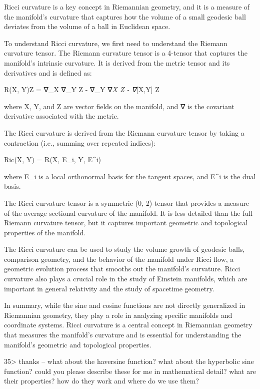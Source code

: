 \documentclass[
]{article}
\begin{document}
Ricci curvature is a key concept in Riemannian geometry, and it is a
measure of the manifold's curvature that captures how the volume of a
small geodesic ball deviates from the volume of a ball in Euclidean
space.

To understand Ricci curvature, we first need to understand the Riemann
curvature tensor. The Riemann curvature tensor is a 4-tensor that
captures the manifold's intrinsic curvature. It is derived from the
metric tensor and its derivatives and is defined as:

R(X, Y)Z = ∇\_X ∇\_Y Z - ∇\_Y ∇\emph{X Z - ∇}{[}X,Y{]} Z

where X, Y, and Z are vector fields on the manifold, and ∇ is the
covariant derivative associated with the metric.

The Ricci curvature is derived from the Riemann curvature tensor by
taking a contraction (i.e., summing over repeated indices):

Ric(X, Y) = R(X, E\_i, Y, E\^{}i)

where E\_i is a local orthonormal basis for the tangent spaces, and
E\^{}i is the dual basis.

The Ricci curvature tensor is a symmetric (0, 2)-tensor that provides a
measure of the average sectional curvature of the manifold. It is less
detailed than the full Riemann curvature tensor, but it captures
important geometric and topological properties of the manifold.

The Ricci curvature can be used to study the volume growth of geodesic
balls, comparison geometry, and the behavior of the manifold under Ricci
flow, a geometric evolution process that smooths out the manifold's
curvature. Ricci curvature also plays a crucial role in the study of
Einstein manifolds, which are important in general relativity and the
study of spacetime geometry.

In summary, while the sine and cosine functions are not directly
generalized in Riemannian geometry, they play a role in analyzing
specific manifolds and coordinate systems. Ricci curvature is a central
concept in Riemannian geometry that measures the manifold's curvature
and is essential for understanding the manifold's geometric and
topological properties.

35\textgreater{} thanks -- what about the haversine function? what about
the hyperbolic sine function? could you please describe these for me in
mathematical detail? what are their properties? how do they work and
where do we use them?
\end{document}
